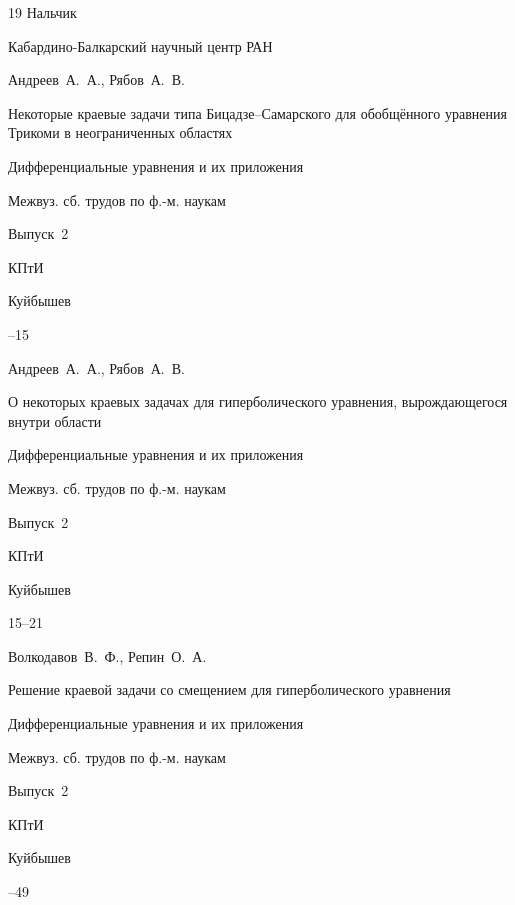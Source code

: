 \begin{thebibliography}{19}
\publaddr Нальчик

\publ Кабардино-Балкарский научный центр РАН






\by Андреев~А.~А., Рябов~А.~В.

\paper Некоторые краевые задачи типа Бицадзе--Самарского для обобщённого уравнения Трикоми в неограниченных областях

\inbook Дифференциальные уравнения и их приложения

\bookinfo Межвуз. сб. трудов по ф.-м. наукам

\issueinfo Выпуск~2

\publ КПтИ

\publaddr Куйбышев 


--15




\by Андреев~А.~А., Рябов~А.~В.

\paper О некоторых краевых задачах для гиперболического уравнения, вырождающегося внутри области

\inbook Дифференциальные уравнения и их приложения

\bookinfo Межвуз. сб. трудов по ф.-м. наукам

\issueinfo Выпуск~2

\publ КПтИ

\publaddr Куйбышев 


\pages \mbox{15--21}




\by Волкодавов~В.~Ф., Репин~О.~А.

\paper Решение краевой задачи со смещением для гиперболического уравнения

\inbook Дифференциальные уравнения и их приложения

\bookinfo Межвуз. сб. трудов по ф.-м. наукам

\issueinfo Выпуск~2

\publ КПтИ

\publaddr Куйбышев 


--49




\end{thebibliography}
